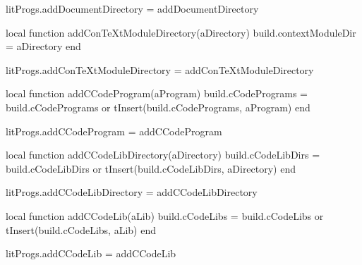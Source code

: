 litProgs.addDocumentDirectory = addDocumentDirectory

local function addConTeXtModuleDirectory(aDirectory)
  build.contextModuleDir = aDirectory
end

litProgs.addConTeXtModuleDirectory = addConTeXtModuleDirectory

local function addCCodeProgram(aProgram)
  build.cCodePrograms = build.cCodePrograms or { }
  tInsert(build.cCodePrograms, aProgram)
end

litProgs.addCCodeProgram = addCCodeProgram

local function addCCodeLibDirectory(aDirectory)
  build.cCodeLibDirs = build.cCodeLibDirs or { }
  tInsert(build.cCodeLibDirs, aDirectory)
end

litProgs.addCCodeLibDirectory = addCCodeLibDirectory

local function addCCodeLib(aLib)
  build.cCodeLibs = build.cCodeLibs or { }
  tInsert(build.cCodeLibs, aLib)
end

litProgs.addCCodeLib = addCCodeLib

